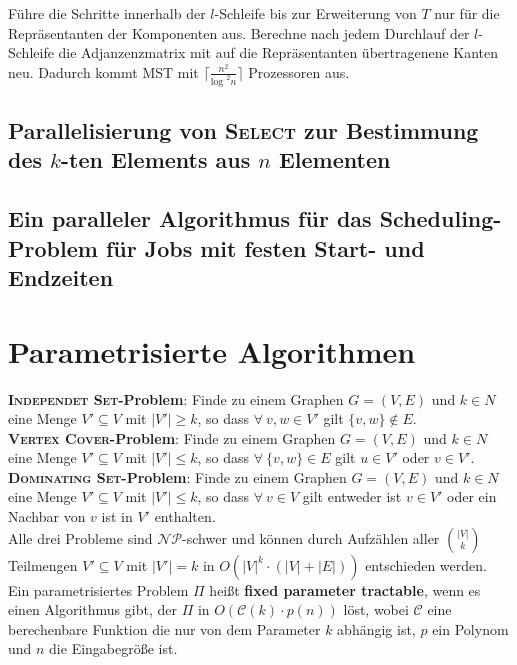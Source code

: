 \documentclass[a4paper,10pt]{scrartcl}
\newcommand{\tbf}{\textbf}
\newcommand{\tsc}{\textsc}
\newcommand{\Gr}{$G = (V,E)$ }
\newcommand{\NP}{\mathcal{NP}}
\newcommand{\calC}{\mathcal{C}}
\begin{document}
Führe die Schritte innerhalb der $l$-Schleife bis zur Erweiterung von $T$ nur für die Repräsentanten der Komponenten aus. Berechne nach jedem Durchlauf der $l$-Schleife die Adjanzenzmatrix mit auf die Repräsentanten übertragenene Kanten neu. Dadurch kommt \tsc{MST} mit $\lceil \frac{n^2}{\text{log }^2 n} \rceil$ Prozessoren aus. \\

\subsection{Parallelisierung von \tsc{Select} zur Bestimmung des $k$-ten Elements aus $n$ Elementen}

\subsection{Ein paralleler Algorithmus für das Scheduling-Problem für Jobs mit festen Start- und Endzeiten}

\newpage
\section{Parametrisierte Algorithmen}
\tbf{\tsc{Independet Set}-Problem}: Finde zu einem Graphen \Gr und $k \in N$ eine Menge $V' \subseteq V$ mit $|V'| \geq k$, so dass $\forall \ v,w \in V'$ gilt $\{v,w\} \not \in E$. \\

\tbf{\tsc{Vertex Cover}-Problem}: Finde zu einem Graphen \Gr und $k \in N$ eine Menge $V' \subseteq V$ mit $|V'| \leq k$, so dass $\forall \ \{v,w\} \in E$ gilt $u \in V'$ oder $v \in V'$. \\

\tbf{\tsc{Dominating Set}-Problem}: Finde zu einem Graphen \Gr und $k \in N$ eine Menge $V' \subseteq V$ mit $|V'| \leq k$, so dass $\forall \ v \in V$ gilt entweder ist $v \in V'$ oder ein Nachbar von $v$ ist in $V'$ enthalten. \\

Alle drei Probleme sind $\NP$-schwer und können durch Aufzählen aller $\binom{|V|}{k}$ Teilmengen $V' \subseteq V$ mit $|V'| = k$ in $O(|V|^k \cdot (|V| + |E|))$ entschieden werden. \\

Ein parametrisiertes Problem $\Pi$ heißt \tbf{fixed parameter tractable}, wenn es einen Algorithmus gibt, der $\Pi$ in $O(\calC(k) \cdot p(n))$ löst, wobei $\calC$ eine berechenbare Funktion die nur von dem Parameter $k$ abhängig ist, $p$ ein Polynom und $n$ die Eingabegröße ist. \\
\end{document}
